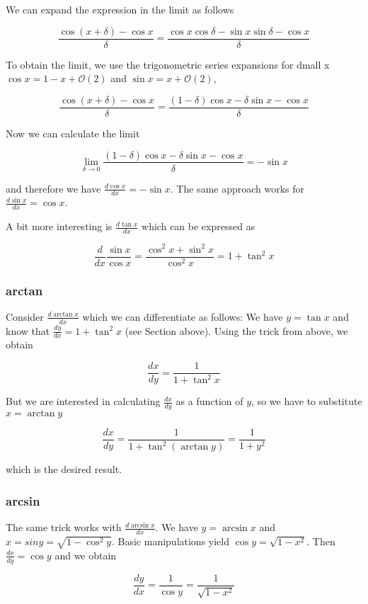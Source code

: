 We can expand the expression in the limit as follows

\[\frac{\cos(x+\delta) - \cos x}{\delta} = \frac{\cos x \cos \delta - \sin x \sin \delta - \cos x}{\delta}\]

To obtain the limit, we use the trigonometric series expansions for dmall x $\cos x = 1 - x +
\mathcal{O}(2)$ and $\sin x = x + \mathcal{O}(2)$,

\[\frac{\cos(x+\delta) - \cos x}{\delta} = \frac{ (1 - \delta) \cos x - \delta \sin x - \cos x}{\delta}\]

Now we can calculate the limit

\[\lim_{\delta \rightarrow 0} \frac{ (1 - \delta) \cos x - \delta \sin x - \cos x}{\delta} = - \sin x\]

and therefore we have $\frac{d \cos x}{dx} = -\sin x$. The same approach works for $\frac{d \sin x}{dx} = \cos x$.

A bit more interesting is $\frac{d \tan x}{dx}$ which can be expressed as

\[ \frac{d}{dx} \frac{\sin x}{\cos x} = \frac{\cos^2 x + \sin^2 x}{\cos^2 x} = 1 + \tan^2 x\]

\subsubsection{arctan}

Consider $\frac{d \arctan x}{dx}$ which we can differentiate as follows: We have $y=\tan x$ and know that $\frac{dy}{dx}= 1 + \tan^2 x$ (see Section above). Using the trick from above, we obtain

\[ \frac{dx}{dy} = \frac{1}{1 + \tan^2 x} \]

But we are interested in calculating $\frac{dx}{dy}$  as a function of $y$, so we have to substitute $
x=\arctan y$

\[ \frac{dx}{dy} = \frac{1}{1 + \tan^2 (\arctan y)} = \frac{1}{1 + y^2} \]

which is the desired result.

\subsubsection{arcsin}

The same trick works with $\frac{d \arcsin x}{dx}$. We have $y=\arcsin x$ and $x = sin y =
\sqrt{1 - \cos^2 y}$. Basic manipulations yield $\cos y = \sqrt{1 - x^2}$. Then $\frac{dx}{dy} = \cos y$  and we obtain

\[ \frac{dy}{dx} = \frac{1}{\cos y} = \frac{1}{\sqrt{1 - x^2}} \]
